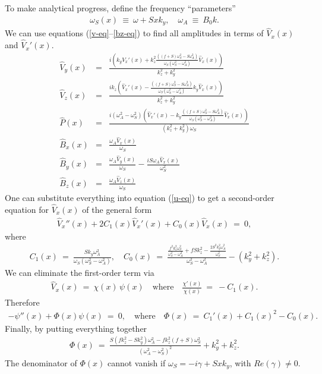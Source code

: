 \documentclass[openacc]{rsproca_new}%
\newcommand\Beq{\begin{eqnarray}}
\newcommand\Eeq{\end{eqnarray}}
\begin{document}
To make analytical progress, define the frequency ``parameters'' 
\Beq
\omega_{S}(x) \ \equiv \ \omega + S x k_{y}, \quad \omega_{A}  \ \equiv \ B_{0} k.
\Eeq
We can use equations (\ref{v-eq}--\ref{bz-eq}) to find all amplitudes in terms of $\hat{V}_{x}(x)$ and $\hat{V}_{x}'(x)$. 
\Beq
\hat{V}_{y}(x) &=& \frac{i \left(k_{y} 
   \hat{V}_{x}'(x) + k_{z}^2 \frac{ \left((f+S) \omega
   _S^2-S \omega _A^2\right)}{\omega_{S}
   \left(\omega_{S}^2-\omega _A^2\right)} \hat{V}_{x}(x)\right)}{k_{z}^2+k_{y} ^2} \\
\hat{V}_{z}(x) &=& \frac{i k_{z} \left(\hat{V}_{x}'(x)- \frac{ \left((f+S) \omega
   _S^2-S \omega _A^2\right)}{\omega_{S}
   \left(\omega_{S}^2-\omega _A^2\right)}  k_{y} 
   \hat{V}_{x}(x)\right)}{k_{z}^2+k_{y} ^2} \\
   \hat{P}(x) &=& \frac{i \left(\omega _A^2-\omega_{S}^2\right)
   \left(\hat{V}_{x}'(x) -  k_{y} \frac{ \left((f+S) \omega
   _S^2-S \omega _A^2\right)}{\omega_{S}
   \left(\omega_{S}^2-\omega _A^2\right)}
   \hat{V}_{x}(x)\right)}{\left(k_{z}^2+k_{y} ^2\right)
   \omega_{S}} \\
   \hat{B}_{x}(x) &=& \frac{\omega _A \hat{V}_{x}(x)}{\omega_{S}} \\
   \hat{B}_{y}(x) &=&\frac{\omega _A \hat{V}_{y}(x)}{\omega_{S}} -\frac{i S \omega _A \hat{V}_{x}(x)}{\omega_{S}^2} \\
   \hat{B}_{z}(x) &=& \frac{\omega _A \hat{V}_{z}(x)}{\omega_{S}}
   \Eeq
One can substitute everything into equation (\ref{u-eq}) to get a second-order equation for $\hat{V}_{x}(x)$ of the general form 
\Beq
 \hat{V}_{x}''(x) + 2 C_{1}(x) \hat{V}_{x}'(x) + C_{0}(x) \hat{V}_{x}(x) \ = \ 0,
\Eeq
where
\Beq
   C_{1}(x) \ = \  \frac{ S k_{y}  \omega _A^2}{\omega_{S} ( \omega_{S}^2-\omega _A^2 )} , \quad C_{0}(x) \ = \   \frac{\frac{f^{2} k_{z}^2 \omega_{S}^{2}}{\omega_{S}^{2}-\omega
   _A^2}+f  S  k_{z}^2 -\frac{2 S^2  k_{y}^2 \omega _A^2}{\omega_{S}^{2}}}{\omega_{S}^2-\omega _A^2}  -\left(k_{y}^{2} + k_{z}^2 \right) .
\Eeq
We can eliminate the first-order term via
\Beq
\hat{V}_{x}(x) \ = \ \chi(x)\, \psi(x) \quad \text{where} \quad \frac{\chi'(x)}{\chi(x)} \  = \ - C_{1} (x).
\Eeq
Therefore 
\Beq
-\psi''(x) + \Phi(x) \psi(x) \ = \ 0 \label{Schr-eq}, \quad \text{where}\quad
\Phi(x)  \ = \ C_{1}'(x) + C_{1} (x)^{2} - C_{0}(x).
\Eeq
Finally, by putting everything together 
\Beq
\Phi(x) \ = \ \frac{S  \left(f k_{z}^2-S k_{y}
   ^2\right) \omega _A^2 -f k_{z}^2 (f+S) \omega
   _S^2}{\left(\omega _A^2-\omega
   _S^2\right)^2} + k_{y}^{2} + k_{z}^2 .
\Eeq
The denominator of $\Phi(x)$ cannot vanish if $\omega_{S}=-i \gamma+Sxk_{y}$, with $Re(\gamma)\neq0$. 
\end{document}
